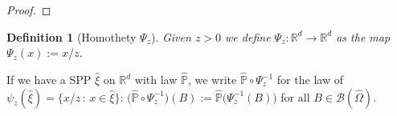 \documentclass[12pt,a4paper,reqno]{amsart}
\newtheorem{Definition}[Theorem]{Definition}
\newcommand{\cB}{\ensuremath{\mathcal B}}
\newcommand{\bbP}{{\ensuremath{\mathbb P}} }
\newcommand{\bbR}{{\ensuremath{\mathbb R}} }
\let\O=\Omega \let\P=\Pi   \let\Ps=\Psi \let\Si=\Sigma \let\X=\Xi
\newcommand{\club}{$\clubsuit$}
\begin{document}
\begin{proof}
  \end{proof}

\bigskip


\begin{Definition}[Homothety $\Psi_z$] \label{def_zaino}
Given $z >0$ we define $\Psi_z: \bbR^d\to \bbR^d$ as the map $\Psi_z (x) := x/z$.
\end{Definition}



If we have a SPP $\hat{\xi}$ on $\bbR^d$ with law $\hat\bbP$,  we write $\hat \bbP\circ \Psi_z ^{-1}$  for the law of $\psi_z(\hat{\xi})=\{x/z\,:\, x\in \hat\xi\}$:
$\bigl(\hat \bbP\circ \Psi_z ^{-1}\bigr)(B):= \hat \bbP\bigl( \Psi_z^{-1} (B)\bigr) $ for all $B \in \cB (\hat\O)$.
\end{document}
